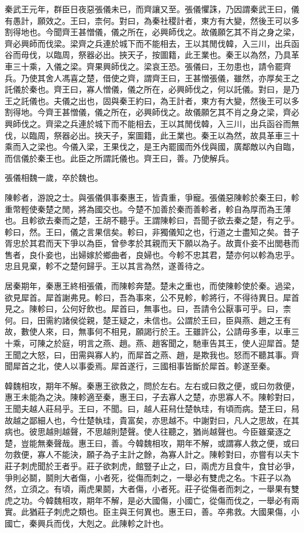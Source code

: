 秦武王元年，群臣日夜惡張儀未已，而齊讓又至。張儀懼誅，乃因謂秦武王曰，儀有愚計，願效之。王曰，柰何。對曰，為秦社稷計者，東方有大變，然後王可以多割得地也。今聞齊王甚憎儀，儀之所在，必興師伐之。故儀願乞其不肖之身之梁，齊必興師而伐梁。梁齊之兵連於城下而不能相去，王以其閒伐韓，入三川，出兵函谷而毋伐，以臨周，祭器必出。挾天子，按圖籍，此王業也。秦王以為然，乃具革車三十乘，入儀之梁。齊果興師伐之。梁哀王恐。張儀曰，王勿患也，請令罷齊兵。乃使其舍人馮喜之楚，借使之齊，謂齊王曰，王甚憎張儀，雖然，亦厚矣王之託儀於秦也。齊王曰，寡人憎儀，儀之所在，必興師伐之，何以託儀。對曰，是乃王之託儀也。夫儀之出也，固與秦王約曰，為王計者，東方有大變，然後王可以多割得地。今齊王甚憎儀，儀之所在，必興師伐之。故儀願乞其不肖之身之梁，齊必興師伐之。齊梁之兵連於城下而不能相去，王以其閒伐韓，入三川，出兵函谷而無伐，以臨周，祭器必出。挾天子，案圖籍，此王業也。秦王以為然，故具革車三十乘而入之梁也。今儀入梁，王果伐之，是王內罷國而外伐與國，廣鄰敵以內自臨，而信儀於秦王也。此臣之所謂託儀也。齊王曰，善。乃使解兵。

張儀相魏一歲，卒於魏也。

陳軫者，游說之士。與張儀俱事秦惠王，皆貴重，爭寵。張儀惡陳軫於秦王曰，軫重幣輕使秦楚之閒，將為國交也。今楚不加善於秦而善軫者，軫自為厚而為王薄也。且軫欲去秦而之楚，王胡不聽乎。王謂陳軫曰，吾聞子欲去秦之楚，有之乎。軫曰，然。王曰，儀之言果信矣。軫曰，非獨儀知之也，行道之士盡知之矣。昔子胥忠於其君而天下爭以為臣，曾參孝於其親而天下願以為子。故賣仆妾不出閭巷而售者，良仆妾也，出婦嫁於鄉曲者，良婦也。今軫不忠其君，楚亦何以軫為忠乎。忠且見棄，軫不之楚何歸乎。王以其言為然，遂善待之。

居秦期年，秦惠王終相張儀，而陳軫奔楚。楚未之重也，而使陳軫使於秦。過梁，欲見犀首。犀首謝弗見。軫曰，吾為事來，公不見軫，軫將行，不得待異日。犀首見之。陳軫曰，公何好飲也。犀首曰，無事也。曰，吾請令公厭事可乎。曰，柰何。曰，田需約諸侯從親，楚王疑之，未信也。公謂於王曰，臣與燕、趙之王有故，數使人來，曰，無事何不相見，願謁行於王。王雖許公，公請毋多車，以車三十乘，可陳之於庭，明言之燕、趙。燕、趙客聞之，馳車告其王，使人迎犀首。楚王聞之大怒，曰，田需與寡人約，而犀首之燕、趙，是欺我也。怒而不聽其事。齊聞犀首之北，使人以事委焉。犀首遂行，三國相事皆斷於犀首。軫遂至秦。

韓魏相攻，期年不解。秦惠王欲救之，問於左右。左右或曰救之便，或曰勿救便，惠王未能為之決。陳軫適至秦，惠王曰，子去寡人之楚，亦思寡人不。陳軫對曰，王聞夫越人莊舄乎。王曰，不聞。曰，越人莊舄仕楚執珪，有頃而病。楚王曰，舄故越之鄙細人也，今仕楚執珪，貴富矣，亦思越不。中謝對曰，凡人之思故，在其病也。彼思越則越聲，不思越則楚聲。使人往聽之，猶尚越聲也。今臣雖棄逐之楚，豈能無秦聲哉。惠王曰，善。今韓魏相攻，期年不解，或謂寡人救之便，或曰勿救便，寡人不能決，願子為子主計之餘，為寡人計之。陳軫對曰，亦嘗有以夫卞莊子刺虎聞於王者乎。莊子欲刺虎，館豎子止之，曰，兩虎方且食牛，食甘必爭，爭則必鬬，鬬則大者傷，小者死，從傷而刺之，一舉必有雙虎之名。卞莊子以為然，立須之。有頃，兩虎果鬬，大者傷，小者死。莊子從傷者而刺之，一舉果有雙虎之功。今韓魏相攻，期年不解，是必大國傷，小國亡，從傷而伐之，一舉必有兩實。此猶莊子刺虎之類也。臣主與王何異也。惠王曰，善。卒弗救。大國果傷，小國亡，秦興兵而伐，大剋之。此陳軫之計也。

